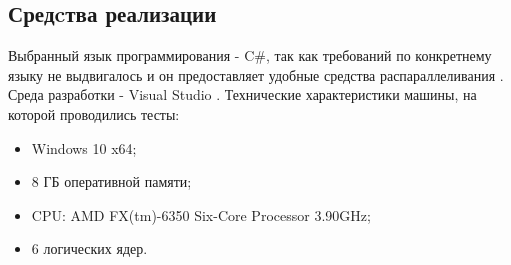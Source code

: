 \documentclass{article}
\begin{document}
	\subsection{Средcтва реализации}
	Выбранный язык программирования - C\#, так как требований по конкретнему языку не выдвигалось и он предоставляет удобные средства распараллеливания \cite{c-parallel}. Среда разработки - Visual Studio \cite{vs}.
\newline
	\indent Технические характеристики машины, на которой проводились тесты:
	\begin{itemize}
	\item Windows 10 x64;
	\item 8 ГБ оперативной памяти;
	\item CPU: AMD FX(tm)-6350 Six-Core Processor 3.90GHz;
	\item 6 логических ядер.
	\end{itemize}	
\end{document}
